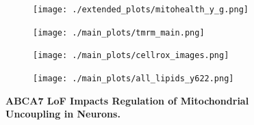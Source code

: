 \begin{figure}[H]
\begin{subfigure}[t]{.2\textwidth}
    \end{subfigure}   
    \begin{subfigure}[t]{.5\textwidth}
        \caption{}
        \texttt{[image: ./extended\_plots/mitohealth\_y\_g.png]}        
    \end{subfigure}    
    \begin{subfigure}[t]{.35\textwidth}
        \caption{}
        \texttt{[image: ./main\_plots/tmrm\_main.png]}        %
    \end{subfigure}    
    \hspace{.25cm}
    \begin{subfigure}[t]{.35\textwidth}
        \caption{}
        \texttt{[image: ./main\_plots/cellrox\_images.png]}        
    \end{subfigure}  
    \hspace{.5cm}
    \begin{subfigure}[t]{.2\textwidth}
        \caption{}
        \texttt{[image: ./main\_plots/all\_lipids\_y622.png]}        
    \end{subfigure}  
    \caption{
        \textbf{ABCA7 LoF Impacts Regulation of Mitochondrial Uncoupling in Neurons.}\\
    }
    \label{fig:main_mitochondrial}
\end{figure}
